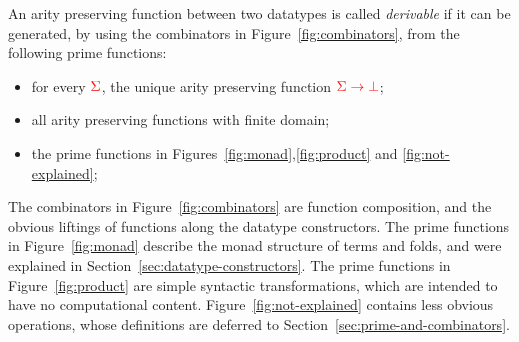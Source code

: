 



\begin{definition}\label{def:derivable-function}
    An  arity preserving function between two datatypes is called \emph{derivable}  if it can be generated, by using the combinators in Figure~\ref{fig:combinators}, from  the following prime functions:
    \begin{itemize}
    \item for every ${\color{red}{\Sigma}}$, the unique arity preserving function ${\color{red}{\Sigma \to {\color{red}{\bot}}}}$;
    \item  all arity preserving functions with finite domain;
        \item  the prime functions in Figures~\ref{fig:monad},\ref{fig:product} and \ref{fig:not-explained};
         \end{itemize}
  

   
\end{definition}



%
The combinators in Figure~\ref{fig:combinators} are  function composition, and the obvious liftings of functions along the datatype constructors. 
The prime functions in Figure~\ref{fig:monad} describe the monad structure of terms and folds, and were explained in Section~\ref{sec:datatype-constructors}. The prime functions in Figure~\ref{fig:product} are  simple syntactic transformations, which are intended to have no computational content.  Figure~\ref{fig:not-explained} contains   less obvious operations, whose definitions are  deferred to Section~\ref{sec:prime-and-combinators}. 

